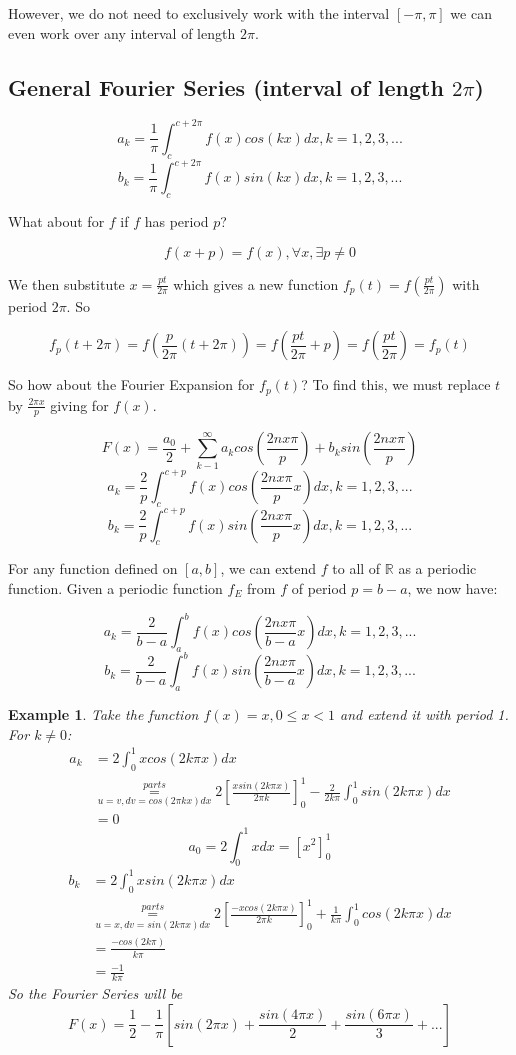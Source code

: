 \documentclass[12pt]{article}
\theoremstyle{plain}
\newtheorem{example}[theorem]{Example}
\theoremstyle{definition}
\begin{document}
However, we do not need to exclusively work with the interval $[-\pi, \pi]$ we can even work over any interval of length $2\pi$.

\subsection{General Fourier Series (interval of length $2\pi$)}

$$a_k = \frac{1}{\pi} \int^{c+2\pi}_{c} f(x) cos(kx) dx, k=1,2,3,...$$
$$b_k = \frac{1}{\pi} \int^{c+2\pi}_{c} f(x) sin(kx) dx, k=1,2,3,...$$

What about for $f$ if $f$ has period $p$?

$$f(x+p) = f(x), \forall x, \exists p \neq 0$$

We then substitute $x = \frac{pt}{2\pi}$ which gives a new function $f_p (t) = f(\frac{pt}{2\pi})$ with period $2\pi$. So

$$f_p (t+2\pi) = f(\frac{p}{2\pi} (t+2\pi)) = f(\frac{pt}{2\pi} + p) = f(\frac{pt}{2\pi}) = f_p (t)$$

So how about the Fourier Expansion for $f_p (t)$? To find this, we must replace $t$ by $\frac{2\pi x}{p}$ giving for $f(x)$.

$$F(x) = \frac{a_0}{2}+ \sum^\infty_{k-1} a_k cos(\frac{2nx\pi}{p}) + b_k sin(\frac{2nx\pi}{p})$$
$$a_k = \frac{2}{p} \int^{c+p}_{c} f(x) cos(\frac{2nx\pi}{p}x) dx, k=1,2,3,...$$
$$b_k = \frac{2}{p} \int^{c+p}_{c} f(x) sin(\frac{2nx\pi}{p}x) dx, k=1,2,3,...$$

For any function defined on $[a,b]$, we can extend $f$ to all of $\mathbb{R}$ as a periodic function. Given a periodic function $f_E$ from $f$ of period $p=b-a$, we now have:

$$a_k = \frac{2}{b-a} \int^{b}_{a} f(x) cos(\frac{2nx\pi}{b-a}x) dx, k=1,2,3,...$$
$$b_k = \frac{2}{b-a} \int^{b}_{a} f(x) sin(\frac{2nx\pi}{b-a}x) dx, k=1,2,3,...$$

\begin{example}
    Take the function $f(x) = x, 0\leq x < 1$ and extend it with period 1. For $k\neq 0$:
    \begin{align*}
        a_k &= 2 \int^{1}_{0} xcos(2k\pi x) dx\\
        &\overset{parts}{\underset{u=v, dv=cos(2\pi kx)dx}{=}} 2[\frac{xsin(2k\pi x)}{2\pi k}]^1_0 - \frac{2}{2k \pi} \int^1_0 sin(2k\pi x) dx\\
        &=0
    \end{align*}
    $$a_0 = 2 \int^1_0 x dx = [x^2 ]^1_0$$
    \begin{align*}
        b_k &= 2\int^1_0 x sin(2k\pi x)dx\\
        &\underset{u=x, dv=sin(2k\pi x)dx}{\overset{parts}{=}} 2[\frac{-xcos(2k\pi x)}{2\pi k}]^1_0 + \frac{1}{k\pi} \int^1_0 cos(2k\pi x)dx\\
        &= \frac{-cos(2k\pi)}{k\pi}\\
        &= \frac{-1}{k\pi}
    \end{align*}
    So the Fourier Series will be
    $$F(x) = \frac{1}{2} - \frac{1}{\pi} [sin(2\pi x) + \frac{sin(4\pi x)}{2} + \frac{sin(6\pi x)}{3} + ...]$$
\end{example}
\end{document}
